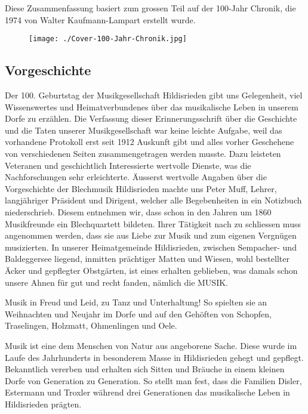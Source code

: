 Diese Zusammenfassung basiert zum grossen Teil auf der 100-Jahr Chronik, die 1974 von Walter Kaufmann-Lampart erstellt wurde.
\begin{figure}[ht]
    \texttt{[image: ./Cover-100-Jahr-Chronik.jpg]}
\end{figure}
\subsection{Vorgeschichte}

\begin{history}

    Der 100. Geburtstag der Musikgesellschaft Hildisrieden gibt uns Gelegenheit,
    viel Wissenswertes und Heimatverbundenes über das musikalische Leben in
    unserem Dorfe zu erzählen. Die Verfassung dieser Erinnerungsschrift über die
    Geschichte und die Taten unserer Musikgesellschaft war keine leichte
    Aufgabe, weil das vorhandene Protokoll erst seit 1912 Auskunft gibt und
    alles vorher Geschehene von verschiedenen Seiten zusammengetragen werden
    musste. Dazu leisteten Veteranen und geschichtlich Interessierte wertvolle
    Dienste, was die Nachforschungen sehr erleichterte. Äusserst wertvolle
    Angaben über die Vorgeschichte der Blechmusik Hildisrieden machte uns Peter
    Muff, Lehrer, langjähriger Präsident und Dirigent, welcher alle
    Begebenheiten in ein Notizbuch niederschrieb. Diesem entnehmen wir, dass
    schon in den Jahren um 1860 Musikfreunde ein Blechquartett bildeten. Ihrer
    Tätigkeit nach zu schliessen muss angenommen werden, dass sie aus Liebe zur
    Musik und zum eigenen Vergnügen musizierten. In unserer Heimatgemeinde
    Hildisrieden, zwischen Sempacher- und Baldeggersee liegend, inmitten
    prächtiger Matten und Wiesen, wohl bestellter Äcker und gepflegter
    Obstgärten, ist eines erhalten geblieben, was damals schon unsere Ahnen für
    gut und recht fanden, nämlich die MUSIK.

    Musik in Freud und Leid, zu Tanz und Unterhaltung! So spielten sie an
    Weihnachten und Neujahr im Dorfe und auf den Gehöften von Schopfen,
    Traselingen, Holzmatt, Ohmenlingen und Oele.

    Musik ist eine dem Menschen von Natur aus angeborene Sache. Diese wurde im
    Laufe des Jahrhunderts in besonderem Masse in Hildisrieden gehegt und
    gepflegt. Bekanntlich vererben und erhalten sich Sitten und Bräuche in einem
    kleinen Dorfe von Generation zu Generation. So stellt man fest, dass die
    Familien Disler, Estermann und Troxler während drei Generationen das
    musikalische Leben in Hildisrieden prägten.

\end{history}
